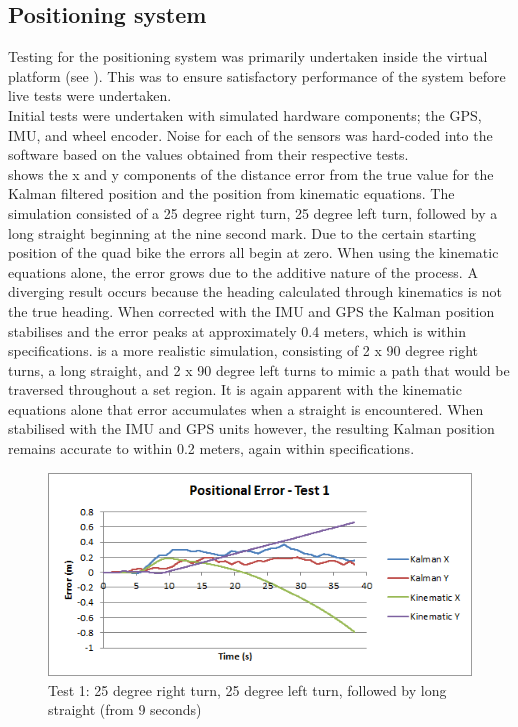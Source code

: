 \documentclass[main.tex]{subfiles}
\begin{document}
\subsection{Positioning system}
Testing for the positioning system was primarily undertaken inside the virtual platform (see ). This was to ensure satisfactory performance of the system before live tests were undertaken.\\
Initial tests were undertaken with simulated hardware components; the GPS, IMU, and wheel encoder. Noise for each of the sensors was hard-coded into the software based on the values obtained from their respective tests.\\
 shows the x and y components of the distance error from the true value for the Kalman filtered position and the position from kinematic equations. The simulation consisted of a 25 degree right turn, 25 degree left turn, followed by a long straight beginning at the nine second mark. Due to the certain starting position of the quad bike the errors all begin at zero. When using the kinematic equations alone, the error grows due to the additive nature of the process. A diverging result occurs because the heading calculated through kinematics is not the true heading. When corrected with the IMU and GPS the Kalman position stabilises and the error peaks at approximately 0.4 meters, which is within specifications.  is a more realistic simulation, consisting of 2 x 90 degree right turns, a long straight, and 2 x 90 degree left turns to mimic a path that would be traversed throughout a set region. It is again apparent with the kinematic equations alone that error accumulates when a straight is encountered. When stabilised with the IMU and GPS units however, the resulting Kalman position remains accurate to within 0.2 meters, again within specifications.
\begin{figure}[ht]
\includegraphics[width=\textwidth]{5-Testing/position_error_test_1.png}
\centering
\caption{Test 1: 25 degree right turn, 25 degree left turn, followed by long straight (from 9 seconds)}
\end{figure}
\end{document}
